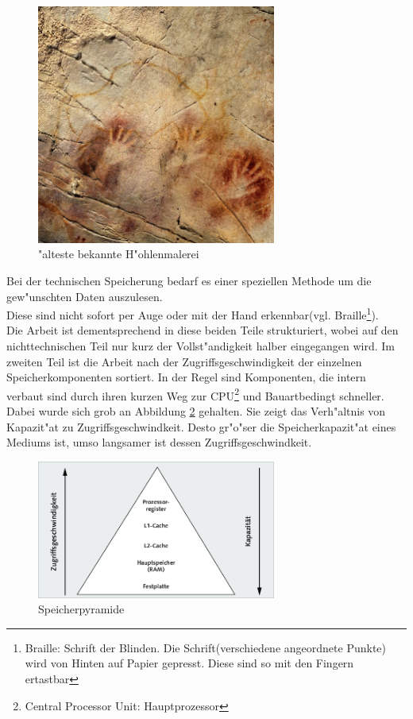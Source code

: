 \begin{figure}[ht]
\centering
\includegraphics[width=0.7\textwidth]{images/hohlenmalerei.jpeg} 
\caption["alteste bekannte H"ohlenmalerei \cite{fig:hohle}]{"alteste bekannte H"ohlenmalerei}
\label{fig:hohlenmalerei}
\end{figure}


Bei der technischen Speicherung bedarf es einer speziellen Methode um die gew"unschten Daten auszulesen. \\Diese sind nicht sofort per Auge oder mit der Hand erkennbar(vgl. Braille\footnote{Braille: Schrift der Blinden. Die Schrift(verschiedene angeordnete Punkte) wird von Hinten auf Papier gepresst. Diese sind so mit den Fingern ertastbar}). 
\\
Die Arbeit ist dementsprechend in diese beiden Teile strukturiert, wobei auf den nichttechnischen Teil nur kurz der Vollst"andigkeit halber eingegangen wird.
Im zweiten Teil ist die Arbeit nach der Zugriffsgeschwindigkeit der einzelnen Speicherkomponenten sortiert. In der Regel sind Komponenten, die intern verbaut sind durch ihren kurzen Weg zur CPU\footnote{Central Processor Unit: Hauptprozessor} und Bauartbedingt schneller.
\\
Dabei wurde sich grob an Abbildung \ref{fig:geschPyr} gehalten. Sie zeigt das Verh"altnis von Kapazit"at zu Zugriffsgeschwindkeit. Desto gr"o"ser die Speicherkapazit"at eines Mediums ist, umso langsamer ist dessen Zugriffsgeschwindkeit. 
\begin{figure}[ht]
\centering
\includegraphics[width=0.7\textwidth]{images/speicherpyramide} 
\caption[Speicherpyramide \cite{fig:Speicherpyramide}]{\glqq Speicherpyramide\grqq{}}
\label{fig:geschPyr}
\end{figure}

